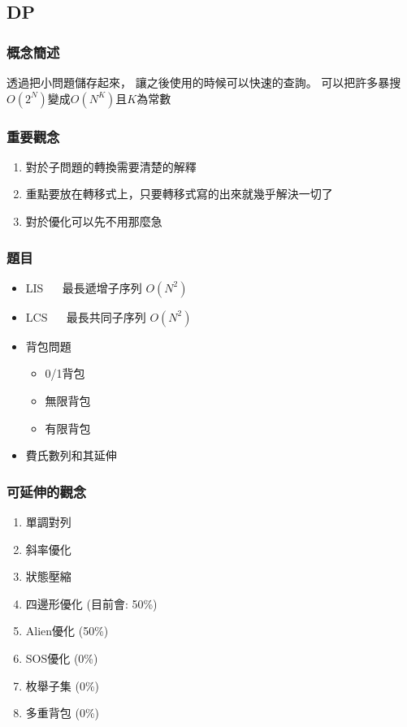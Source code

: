 \documentclass[12pt,oneside]{article}
\begin{document}
\clearpage
\subsection{DP}
\subsubsection*{概念簡述}

透過把小問題儲存起來，
讓之後使用的時候可以快速的查詢。
可以把許多暴搜$O(2^N)$變成$O(N^K)$且$K$為常數

\subsubsection*{重要觀念}
\begin{adjustwidth}{2em}{0em}
\begin{enumerate}
    \item 對於子問題的轉換需要清楚的解釋
    \item 重點要放在轉移式上，只要轉移式寫的出來就幾乎解決一切了
    \item 對於優化可以先不用那麼急
\end{enumerate}
\end{adjustwidth}

\subsubsection*{題目}
\begin{adjustwidth}{2em}{0em}
\begin{itemize}
    \item LIS $\quad$ 最長遞增子序列 $O(N^2)$
    \item LCS $\quad$ 最長共同子序列 $O(N^2)$
    \item 
        背包問題
        \begin{itemize}
            \item 0/1背包 
            \item 無限背包
            \item 有限背包
        \end{itemize}
    \item 費氏數列和其延伸
\end{itemize}
\end{adjustwidth}

\subsubsection*{可延伸的觀念}
\begin{adjustwidth}{2em}{0em}
\begin{enumerate}
    \item 單調對列
    \item 斜率優化
    \item 狀態壓縮
    \item 四邊形優化 (目前會: 50\%)
    \item Alien優化 (50\%)
    \item SOS優化 (0\%)
    \item 枚舉子集 (0\%)
    \item 多重背包 (0\%)
\end{enumerate}
\end{adjustwidth}
\end{document}
